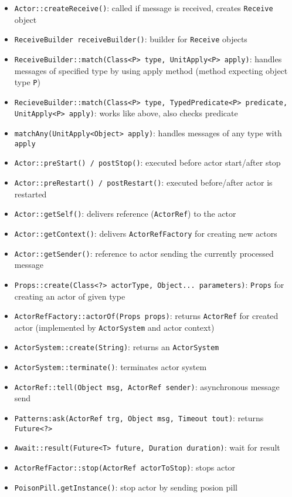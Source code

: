 \documentclass[11pt]{scrartcl}
\begin{document}
\begin{itemize}
    \item \texttt{Actor::createReceive()}: called if message is received, creates \texttt{Receive} object
    \item \texttt{ReceiveBuilder receiveBuilder()}: builder for \texttt{Receive} objects
    \item \texttt{ReceiveBuilder::match(Class<P> type, UnitApply<P> apply)}: handles messages of specified type by using apply method (method expecting object type \texttt{P})
    \item \texttt{RecieveBuilder::match(Class<P> type, TypedPredicate<P> predicate, \\ UnitApply<P> apply)}: works like above, also checks predicate
    \item \texttt{matchAny(UnitApply<Object> apply)}: handles messages of any type with \texttt{apply}
    \item \texttt{Actor::preStart() / postStop()}: executed before actor start/after stop
    \item \texttt{Actor::preRestart() / postRestart()}: executed before/after actor is restarted
    \item \texttt{Actor::getSelf()}: delivers reference (\texttt{ActorRef}) to the actor
    \item \texttt{Actor::getContext()}: delivers \texttt{ActorRefFactory} for creating new actors
    \item \texttt{Actor::getSender()}: reference to actor sending the currently processed message
    \item \texttt{Props::create(Class<?> actorType, Object... parameters)}: \texttt{Props} for creating an actor of given type
    \item \texttt{ActorRefFactory::actorOf(Props props)}: returns \texttt{ActorRef} for created actor (implemented by \texttt{ActorSystem} and actor context)
    \item \texttt{ActorSystem::create(String)}: returns an \texttt{ActorSystem}
    \item \texttt{ActorSystem::terminate()}: terminates actor system
    \item \texttt{ActorRef::tell(Object msg, ActorRef sender)}: asynchronous message send
    \item \texttt{Patterns:ask(ActorRef trg, Object msg, Timeout tout)}: returns \texttt{Future<?>}
    \item \texttt{Await::result(Future<T> future, Duration duration)}: wait for result
    \item \texttt{ActorRefFactor::stop(ActorRef actorToStop)}: stops actor
    \item \texttt{PoisonPill.getInstance()}: stop actor by sending posion pill
\end{itemize}
\end{document}
